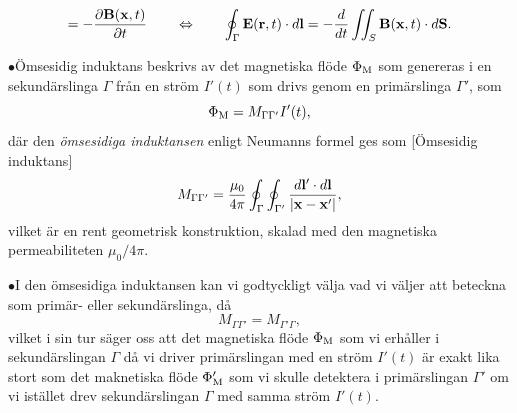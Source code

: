 {{{{{$$      =-{{\partial{\bf B}({\bf x},t)}\over{\partial t}}
    \qquad\Leftrightarrow\qquad
    \oint_{\Gamma}{\bf E}({\bf r},t)\cdot d{\bf l}
      =-{{d}\over{dt}}\iint_S{\bf B}({\bf x},t)\cdot d{\bf S}.
  $$}
\item{$\bullet$}{{\"O}msesidig induktans beskrivs av det magnetiska fl{\"o}de
  $\Phi_{\rm M}$ som genereras i en sekund{\"a}rslinga $\Gamma$ fr{\aa}n en
  str{\"o}m $I'(t)$ som drivs genom en prim{\"a}rslinga $\Gamma'$, som
  $$
    \Phi_{\rm M}=M_{\Gamma\Gamma'} I'(t),
  $$
  d{\"a}r den {\it {\"o}msesidiga induktansen} enligt Neumanns formel ges som
  [{\"O}msesidig induktans]
  $$
    M_{\Gamma\Gamma'}={{\mu_0}\over{4\pi}}\oint_{\Gamma}\oint_{\Gamma'}
          {{d{\bf l}'\cdot d{\bf l}}\over{|{\bf x}-{\bf x}'|}},
  $$
  vilket {\"a}r en rent geometrisk konstruktion, skalad med den magnetiska
  permeabiliteten $\mu_0/4\pi$.}
\item{$\bullet$}{I den {\"o}msesidiga induktansen kan vi godtyckligt v{\"a}lja
  vad vi v{\"a}ljer att beteckna som prim{\"a}r- eller sekund{\"a}rslinga,
  d{\aa}
  $$
    M_{\Gamma\Gamma'}=M_{\Gamma'\Gamma},
  $$
  vilket i sin tur s{\"a}ger oss att det magnetiska fl{\"o}de $\Phi_{\rm M}$
  som vi erh{\aa}ller i sekund{\"a}rslingan $\Gamma$ d{\aa} vi driver
  prim{\"a}rslingan med en str{\"o}m $I'(t)$ {\"a}r exakt lika stort
  som det maknetiska fl{\"o}de $\Phi'_{\rm M}$ som vi skulle detektera
  i prim{\"a}rslingan $\Gamma'$ om vi ist{\"a}llet drev sekund{\"a}rslingan
  $\Gamma$ med samma str{\"o}m $I'(t)$.}

}}}}
